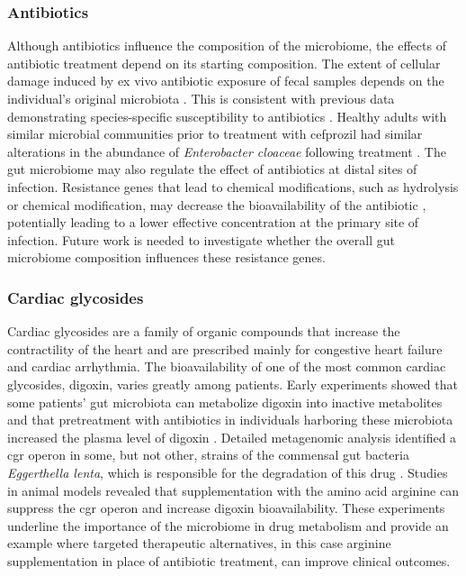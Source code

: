 \subsubsection{Antibiotics}
Although antibiotics influence the composition of the microbiome, the effects of antibiotic treatment depend on its starting composition. The extent of cellular damage induced by ex vivo antibiotic exposure of fecal samples depends on the individual's original microbiota \cite{RN4095}. This is consistent with previous data demonstrating species-specific susceptibility to antibiotics \cite{RN4096}. Healthy adults with similar microbial communities prior to treatment with cefprozil had similar alterations in the abundance of \textit{Enterobacter cloaceae} following treatment \cite{RN4097}. The gut microbiome may also regulate the effect of antibiotics at distal sites of infection. Resistance genes that lead to chemical modifications, such as hydrolysis or chemical modification, may decrease the bioavailability of the antibiotic \cite{RN4098}, potentially leading to a lower effective concentration at the primary site of infection. Future work is needed to investigate whether the overall gut microbiome composition influences these resistance genes.

\subsubsection{Cardiac glycosides}
Cardiac glycosides are a family of organic compounds that increase the contractility of the heart and are prescribed mainly for congestive heart failure and cardiac arrhythmia. The bioavailability of one of the most common cardiac glycosides, digoxin, varies greatly among patients. Early experiments showed that some patients' gut microbiota can metabolize digoxin into inactive metabolites and that pretreatment with antibiotics in individuals harboring these microbiota increased the plasma level of digoxin \cite{RN4099}. Detailed metagenomic analysis identified a \gls{cgr} operon in some, but not other, strains of the commensal gut bacteria \textit{Eggerthella lenta}, which is responsible for the degradation of this drug \cite{RN4102}. Studies in animal models revealed that supplementation with the amino acid arginine can suppress the cgr operon and increase digoxin bioavailability. These experiments underline the importance of the microbiome in drug metabolism and provide an example where targeted therapeutic alternatives, in this case arginine supplementation in place of antibiotic treatment, can improve clinical outcomes.

